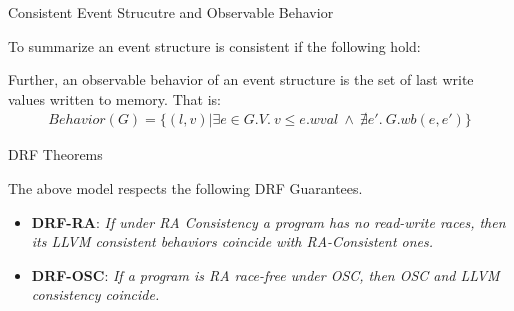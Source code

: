 \documentclass[xcolor=dvipsnames, notes]{beamer}
\begin{document}
    \begin{frame}{Consistent Event Strucutre and Observable Behavior}

        To summarize an event structure is consistent if the following hold:
        \begin{figure}
        \end{figure}

        Further, an observable behavior of an event structure is the set of last write values written to memory.
        That is:
        \begin{align*}
            Behavior(G) = \{(l,v)| \exists e \in G.V. \ v \leq e.wval \ \wedge \ \nexists e'. \ G.wb(e,e')\} 
        \end{align*}

    \end{frame}


    \begin{frame}{DRF Theorems}

        The above model respects the following DRF Guarantees.
        \begin{itemize}
            \item \textbf{DRF-RA}: \textit{If under RA Consistency a program has no read-write races, then its LLVM consistent behaviors coincide with RA-Consistent ones.}
            \item \textbf{DRF-OSC}: \textit{If a program is RA race-free under OSC, then OSC and LLVM consistency coincide.}
        \end{itemize}

    \end{frame}
\end{document}
